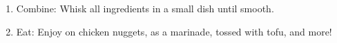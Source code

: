 \begin{enumerate}
  \item Combine: Whisk all ingredients in a small dish until smooth.
  \item Eat: Enjoy on chicken nuggets, as a marinade, tossed with tofu, and more!
\end{enumerate}
